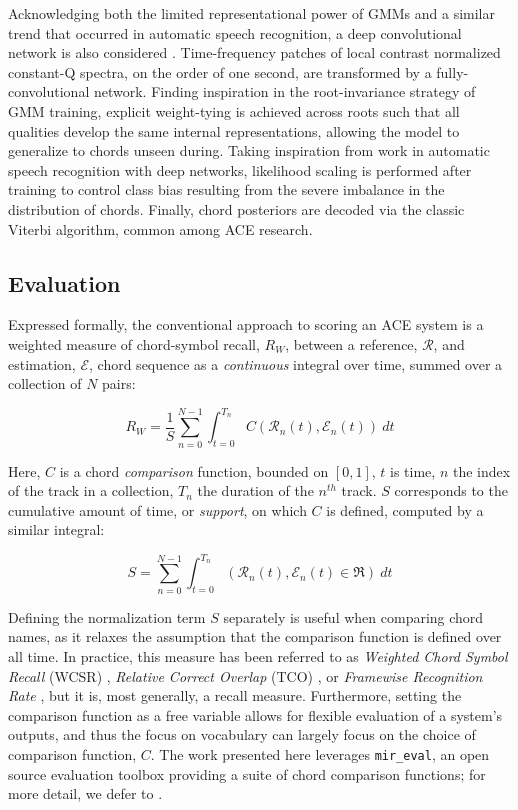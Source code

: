 \documentclass{article}
\begin{document}
Acknowledging both the limited representational power of GMMs and a similar trend that occurred in automatic speech recognition, a deep convolutional network is also considered \cite{Humphrey2015Fully}.
Time-frequency patches of local contrast normalized constant-Q spectra, on the order of one second, are transformed by a fully-convolutional network.
Finding inspiration in the root-invariance strategy of GMM training, explicit weight-tying is achieved across roots such that all qualities develop the same internal representations, allowing the model to generalize to chords unseen during.
Taking inspiration from work in automatic speech recognition with deep networks, likelihood scaling is performed after training to control class bias resulting from the severe imbalance in the distribution of chords.
Finally, chord posteriors are decoded via the classic Viterbi algorithm, common among ACE research.


\subsection{Evaluation}

Expressed formally, the conventional approach to scoring an ACE system is a weighted measure of chord-symbol recall, $R_{W}$, between a reference, $\mathcal{R}$, and estimation, $\mathcal{E}$, chord sequence as a \emph{continuous} integral over time, summed over a collection of $N$ pairs:

\begin{equation}
\label{eq:recall_micro}
R_{W} = \frac{1}{S}\sum_{n=0}^{N-1}\int_{t=0}^{T_n}C(\mathcal{R}_n(t), \mathcal{E}_n(t))~dt
\end{equation}

\noindent Here, $C$ is a chord \emph{comparison} function, bounded on $[0, 1]$, $t$ is time, $n$ the index of the track in a collection, $T_n$ the duration of the $n^{th}$ track. $S$ corresponds to the cumulative amount of time, or \emph{support}, on which $C$ is defined, computed by a similar integral:

\begin{equation}
S = \sum_{n=0}^{N-1}\int_{t=0}^{T_n}(\mathcal{R}_n(t), \mathcal{E}_n(t) \in \Re)~dt
\end{equation}

Defining the normalization term $S$ separately is useful when comparing chord names, as it relaxes the assumption that the comparison function is defined over all time.
In practice, this measure has been referred to as \emph{Weighted Chord Symbol Recall} (WCSR) \cite{Harte2010Towards}, \emph{Relative Correct Overlap} (TCO) \cite{McVicar2013Machine}, or \emph{Framewise Recognition Rate} \cite{Cho2014Improved}, but it is, most generally, a recall measure.
Furthermore, setting the comparison function as a free variable allows for flexible evaluation of a system's outputs, and thus the focus on vocabulary can largely focus on the choice of comparison function, $C$.
The work presented here leverages \texttt{mir\_eval}, an open source evaluation toolbox providing a suite of chord comparison functions;
for more detail, we defer to \cite{Raffel2014Eval}.
\end{document}
